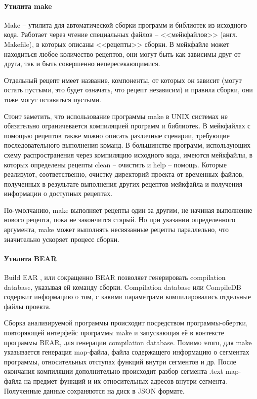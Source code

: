 \paragraph{Утилита make}\label{sec:ch2/sec2/sub3/sub1/par1}\mbox{}

Make -- утилита для автоматической сборки программ и библиотек из исходного кода.
Работает через чтение специальных файлов -- <<мейкфайлов>> (англ. Makefile), в которых 
описаны <<рецепты>> сборки. В мейкфайле может находиться любое количество рецептов, они могут
быть как зависимы друг от друга, так и быть совершенно непересекающимися.

Отдельный рецепт имеет название, компоненты, от которых он зависит (могут остать пустыми, это будет означать,
что рецепт независим) и правила сборки, они тоже могут оставаться пустыми.

Стоит заметить, что использование программы make в UNIX системах не обязательно ограничевается
компиляцией программ и библиотек. В мейкфайлах с помощью рецептов также можно описать различные сценарии,
требующие последовательного выполнения команд. В большинстве программ, использующих схему распространения
через компиляцию исходного кода, имеются мейкфайлы, в которых определены рецепты clean -- очистить и help --
помощь. Которые реализуют, соответственно, очистку директорий проекта от временных файлов, полученных в результате
выполнения других рецептов мейкфайла и получения информации о доступных рецептах.

По-умолчанию, make выполняет рецепты один за другим, не начиная выполнение нового рецепта, пока
не закончится старый. Но при указании определенного аргумента, make может выполнять несвязанные рецепты
параллельно, что значительно ускоряет процесс сборки.

\paragraph{Утилита BEAR}\label{sec:ch2/sec2/sub3/sub1/par2}\mbox{}

Build EAR \autocite{bear}, или сокращенно BEAR позволяет генерировать compilation database, указывая ей
команду сборки. Compilation database или CompileDB содержит информацию о том, с какими параметрами
компилировались отдельные файлы проекта.

Сборка анализируемой программы происходит посредством программы-обертки, повторяющей интерфейс программы make
и запускающая её в контексте программы BEAR, для генерации compilation database. Помимо этого, для make
указывается генерация map-файла, файла содержащего информацию о сегментах программы,
относительных отступах функций внутри сегментов и др. После окончания компиляции дополнительно
происходит разбор сегмента .text map-файла на предмет функций и их относительных адресов внутри сегмента.
Полученные данные сохраняются на диск в JSON формате.

